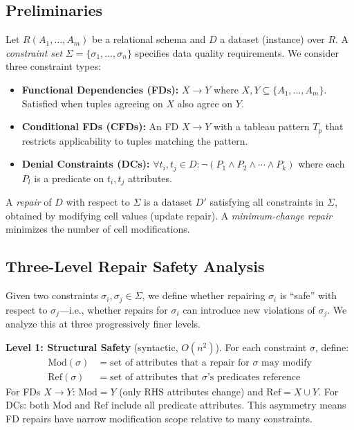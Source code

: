 \documentclass{article}
\newcommand{\Modd}{\mathrm{Mod}}
\newcommand{\Reff}{\mathrm{Ref}}
\begin{document}
\subsection{Preliminaries}
\label{sec:prelim}

Let $R(A_1, \ldots, A_m)$ be a relational schema and $D$ a dataset (instance) over $R$. A \emph{constraint set} $\Sigma = \{\sigma_1, \ldots, \sigma_n\}$ specifies data quality requirements. We consider three constraint types:

\begin{itemize}
  \item \textbf{Functional Dependencies (FDs):} $X \to Y$ where $X, Y \subseteq \{A_1, \ldots, A_m\}$. Satisfied when tuples agreeing on $X$ also agree on $Y$.
  \item \textbf{Conditional FDs (CFDs):} An FD $X \to Y$ with a tableau pattern $T_p$ that restricts applicability to tuples matching the pattern.
  \item \textbf{Denial Constraints (DCs):} $\forall t_i, t_j \in D: \neg(P_1 \land P_2 \land \cdots \land P_k)$ where each $P_l$ is a predicate on $t_i, t_j$ attributes.
\end{itemize}

A \emph{repair} of $D$ with respect to $\Sigma$ is a dataset $D'$ satisfying all constraints in $\Sigma$, obtained by modifying cell values (update repair). A \emph{minimum-change repair} minimizes the number of cell modifications.

\subsection{Three-Level Repair Safety Analysis}
\label{sec:safety}

Given two constraints $\sigma_i, \sigma_j \in \Sigma$, we define whether repairing $\sigma_i$ is ``safe'' with respect to $\sigma_j$---i.e., whether repairs for $\sigma_i$ can introduce new violations of $\sigma_j$. We analyze this at three progressively finer levels.

\textbf{Level 1: Structural Safety} (syntactic, $O(n^2)$).
For each constraint $\sigma$, define:
\begin{align}
  \Modd(\sigma) &= \text{set of attributes that a repair for } \sigma \text{ may modify} \\
  \Reff(\sigma) &= \text{set of attributes that } \sigma\text{'s predicates reference}
\end{align}
For FDs $X \to Y$: $\Modd = Y$ (only RHS attributes change) and $\Reff = X \cup Y$. For DCs: both $\Modd$ and $\Reff$ include all predicate attributes. This asymmetry means FD repairs have narrow modification scope relative to many constraints.
\end{document}
